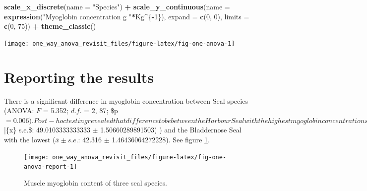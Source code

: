 \documentclass[
]{book}
\newenvironment{Shaded}{\begin{snugshade}}{\end{snugshade}}
\newcommand{\CommentTok}[1]{\textcolor[rgb]{0.56,0.35,0.01}{\textit{#1}}}
\newcommand{\DataTypeTok}[1]{\textcolor[rgb]{0.13,0.29,0.53}{#1}}
\newcommand{\DecValTok}[1]{\textcolor[rgb]{0.00,0.00,0.81}{#1}}
\newcommand{\KeywordTok}[1]{\textcolor[rgb]{0.13,0.29,0.53}{\textbf{#1}}}
\newcommand{\NormalTok}[1]{#1}
\newcommand{\OperatorTok}[1]{\textcolor[rgb]{0.81,0.36,0.00}{\textbf{#1}}}
\newcommand{\StringTok}[1]{\textcolor[rgb]{0.31,0.60,0.02}{#1}}
\begin{document}
\begin{Shaded}
\begin{Highlighting}[]
\StringTok{  }\KeywordTok{scale_x_discrete}\NormalTok{(}\DataTypeTok{name =} \StringTok{"Species"}\NormalTok{) }\OperatorTok{+}
\StringTok{  }\KeywordTok{scale_y_continuous}\NormalTok{(}\DataTypeTok{name =} \KeywordTok{expression}\NormalTok{(}\StringTok{"Myoglobin concentration g "}\OperatorTok{*}\NormalTok{Kg}\OperatorTok{^}\NormalTok{\{}\OperatorTok{-}\DecValTok{1}\NormalTok{\}),}
                     \DataTypeTok{expand =} \KeywordTok{c}\NormalTok{(}\DecValTok{0}\NormalTok{, }\DecValTok{0}\NormalTok{),}
                     \DataTypeTok{limits =} \KeywordTok{c}\NormalTok{(}\DecValTok{0}\NormalTok{, }\DecValTok{75}\NormalTok{)) }\OperatorTok{+}
\StringTok{  }\KeywordTok{theme_classic}\NormalTok{()}
\end{Highlighting}
\end{Shaded}

\begin{flushleft}\texttt{[image: one\_way\_anova\_revisit\_files/figure-latex/fig-one-anova-1]} \end{flushleft}

\hypertarget{reporting-the-results-2}{%
\section{Reporting the results}\label{reporting-the-results-2}}

\begin{Shaded}
\end{Shaded}

There is a significant difference in myoglobin concentration between Seal species (ANOVA: \(F\) = 5.352; \(d.f.\) = 2, 87; \$p \(= 0.006). Post-hoc testing revealed that difference to be between the Harbour Seal with the highest myoglobin concentrations (\)\bar\{x\} \pm s.e.\$: 49.0103333333333 \(\pm\) 1.50660289891503) ) and the Bladdernose Seal with the lowest (\(\bar{x} \pm s.e.\): 42.316 \(\pm\) 1.46436064272228). See figure \ref{fig:fig-one-anova-report}.



\begin{figure}

\texttt{[image: one\_way\_anova\_revisit\_files/figure-latex/fig-one-anova-report-1]} \hfill{}

\caption{Muscle myoglobin content of three seal species.}\label{fig:fig-one-anova-report}
\end{figure}
\end{document}
